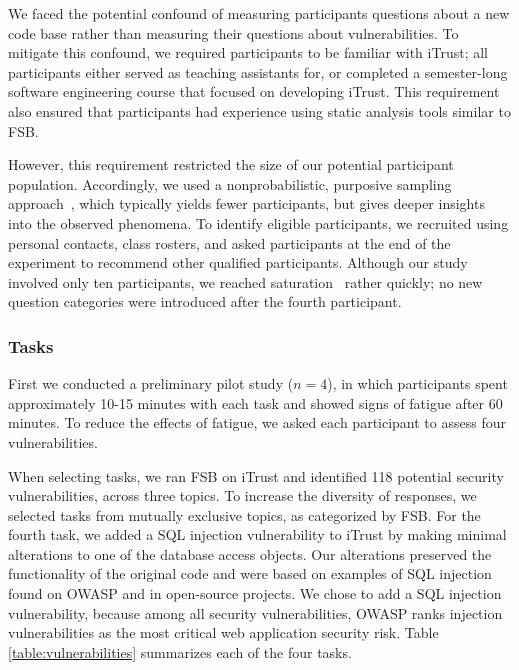 \documentclass{acm_proc_article-sp}
\begin{document}
We faced the potential confound of measuring participants questions about a new code base rather than measuring their questions about vulnerabilities.
To mitigate this confound, we required participants to be familiar with iTrust;
all participants either served as teaching assistants for, or completed a semester-long software engineering course that focused on developing iTrust.
This requirement also ensured that participants had experience using static analysis tools similar to FSB.

However, this requirement restricted the size of our potential participant population.
Accordingly, we used a nonprobabilistic, purposive sampling approach~\cite{guest2006many}, which typically yields fewer participants, but gives deeper insights into the observed phenomena.
To identify eligible participants, we recruited using personal contacts, class rosters, and asked participants at the end of the experiment to recommend other qualified participants.
Although our study involved only ten participants, we reached saturation~\cite{glaser2009discovery} rather quickly; 
no new question categories were introduced after the fourth participant.

%



  
\subsubsection{Tasks}
First we conducted a preliminary pilot study ($n = 4$), in which  participants spent approximately 10-15 minutes with each task and showed signs of fatigue after 60 minutes.
To reduce the effects of fatigue, we asked each participant to assess four vulnerabilities. 

When selecting tasks, we ran FSB on iTrust and identified 118 potential security vulnerabilities, across three topics.
To increase the diversity of responses, we selected tasks from mutually exclusive topics, as categorized by FSB.
For the fourth task, we added a SQL injection vulnerability to iTrust by making minimal alterations to one of the database access objects.
Our alterations preserved the functionality of the original code and were based on examples of SQL injection found on OWASP and in open-source projects.
We chose to add a SQL injection vulnerability, because among all security vulnerabilities, OWASP ranks injection vulnerabilities as the most critical web application security risk.
Table \ref{table:vulnerabilities} summarizes each of the four tasks. 
\end{document}
